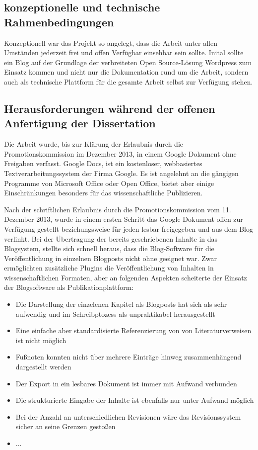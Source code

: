\subsection{konzeptionelle und technische Rahmenbedingungen}

Konzeptionell war das Projekt so angelegt, dass die Arbeit unter allen Umständen jederzeit frei und offen Verfügbar einsehbar sein sollte. Inital sollte ein Blog auf der Grundlage der verbreiteten Open Source-Lösung Wordpress zum Einsatz kommen und nicht nur die Dokumentation rund um die Arbeit, sondern auch als technische Plattform für die gesamte Arbeit selbst zur Verfügung stehen.

\subsection{Herausforderungen während der offenen Anfertigung der Dissertation}

Die Arbeit wurde, bis zur Klärung der Erlaubnis durch die Promotionskommission im Dezember 2013, in einem Google Dokument ohne Freigaben verfasst. Google Docs, ist ein kostenloser, webbasiertes Textverarbeitungssystem der Firma Google. Es ist angelehnt an die gängigen Programme von Microsoft Office oder Open Office, bietet aber einige Einschränkungen besonders für das wissenschaftliche Publizieren.

Nach der schriftlichen Erlaubnis durch die Promotionskommission vom 11. Dezember 2013, wurde in einem ersten Schritt das Google Dokument offen zur Verfügung gestellt beziehungsweise für jeden lesbar freigegeben und aus dem Blog verlinkt. Bei der Übertragung der bereits geschriebenen Inhalte in das Blogsystem, stellte sich schnell heraus, dass die Blog-Software für die Veröffentlichung in einzelnen Blogposts nicht ohne geeignet war. Zwar ermöglichten zusätzliche Plugins die Veröffentlichung von Inhalten in wissenschaftlichen Formaten, aber an folgenden Aspekten scheiterte der Einsatz der Blogsoftware als Publikationplattform:
\begin{itemize}
\item Die Darstellung der einzelenen Kapitel als Blogposts hat sich als sehr aufwendig und im Schreibptozess als unpraktikabel herausgestellt
\item Eine einfache aber standardisierte Referenzierung von von Literaturverweisen ist nicht möglich
\item Fußnoten konnten nicht über mehrere Einträge hinweg zusammenhängend dargestellt werden
\item Der Export in ein lesbares Dokument ist immer mit Aufwand verbunden
\item Die strukturierte Eingabe der Inhalte ist ebenfalls nur unter Aufwand möglich
\item Bei der Anzahl an unterschiedlichen Revisionen wäre das Revisionssystem sicher an seine Grenzen gestoßen
\item ...
\end{itemize}

